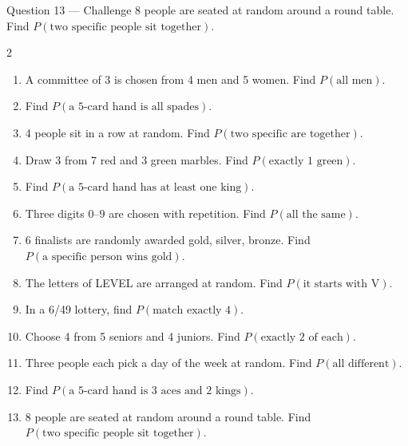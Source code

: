 \documentclass[11pt]{article}
\begin{document}
\begin{qbox}{Question 13 --- Challenge}
8 people are seated at random around a round table. Find $P(\text{two specific people sit together})$.\workspace{3cm}
\end{qbox}

\clearpage
{}

\begin{recapbox}
\begin{multicols}{2}
\small
\begin{enumerate}[leftmargin=*,itemsep=3pt]
  \item A committee of 3 is chosen from 4 men and 5 women. Find $P(\text{all men})$.
  \item Find $P(\text{a 5-card hand is all spades})$.
  \item 4 people sit in a row at random. Find $P(\text{two specific are together})$.
  \item Draw 3 from 7 red and 3 green marbles. Find $P(\text{exactly 1 green})$.
  \item Find $P(\text{a 5-card hand has at least one king})$.
  \item Three digits $0$--$9$ are chosen with repetition. Find $P(\text{all the same})$.
  \item 6 finalists are randomly awarded gold, silver, bronze. Find $P(\text{a specific person wins gold})$.
  \item The letters of LEVEL are arranged at random. Find $P(\text{it starts with V})$.
  \item In a 6/49 lottery, find $P(\text{match exactly 4})$.
  \item Choose 4 from 5 seniors and 4 juniors. Find $P(\text{exactly 2 of each})$.
  \item Three people each pick a day of the week at random. Find $P(\text{all different})$.
  \item Find $P(\text{a 5-card hand is 3 aces and 2 kings})$.
  \item 8 people are seated at random around a round table. Find $P(\text{two specific people sit together})$.
\end{enumerate}
\end{multicols}
\end{recapbox}
\end{document}
